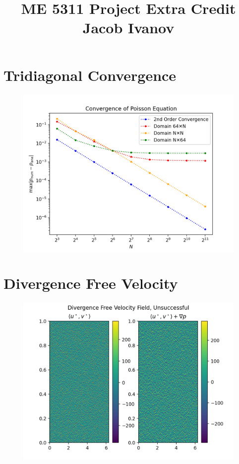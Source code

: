 \documentclass[12pt, reqno]{amsart}
\begin{document}
\title{ME 5311 \quad Project Extra Credit \quad Jacob Ivanov}

\maketitle
\section{Tridiagonal Convergence}
\begin{figure}[H]
    \centering
    \includegraphics[width=1\linewidth]{Poisson Convergence.png}
\end{figure}

\section{Divergence Free Velocity}
\begin{figure}[H]
    \centering
    \includegraphics[width=1\linewidth]{Divergence Free Velocity.png}
\end{figure}
\end{document}
